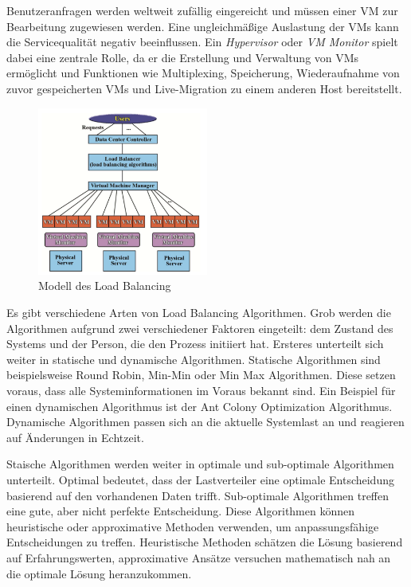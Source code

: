 \documentclass[a4paper,12pt]{article}
\begin{document}
Benutzeranfragen werden weltweit zufällig eingereicht und müssen einer \ac{VM} zur Bearbeitung zugewiesen werden. Eine ungleichmäßige Auslastung der \acp{VM} kann die Servicequalität negativ beeinflussen. Ein \textit{Hypervisor} oder \textit{\ac{VM} Monitor} spielt dabei eine zentrale Rolle, da er die Erstellung und Verwaltung von \acp{VM} ermöglicht und Funktionen wie Multiplexing, Speicherung, Wiederaufnahme von zuvor gespeicherten \acp{VM} und Live-Migration zu einem anderen Host bereitstellt. \cite[S. 2]{LoadBalancing}

\begin{figure}[h]
    \centering
    \includegraphics[width=0.5\textwidth]{images/Load_Balancing.png}
    \caption{Modell des Load Balancing \cite[S. 2]{LoadBalancing}}
    \label{fig:LoadBalancing}
\end{figure}

Es gibt verschiedene Arten von Load Balancing Algorithmen. Grob werden die Algorithmen aufgrund zwei verschiedener Faktoren eingeteilt: dem Zustand des Systems und der Person, die den Prozess initiiert hat. 
Ersteres unterteilt sich weiter in statische und dynamische Algorithmen. Statische Algorithmen sind beispielsweise Round Robin, Min-Min oder Min Max Algorithmen. Diese setzen voraus, dass alle Systeminformationen im Voraus bekannt sind. Ein Beispiel für einen dynamischen Algorithmus ist der Ant Colony Optimization Algorithmus. Dynamische Algorithmen passen sich an die aktuelle Systemlast an und reagieren auf Änderungen in Echtzeit. 

Staische Algorithmen werden weiter in optimale und sub-optimale Algorithmen unterteilt. Optimal bedeutet, dass der Lastverteiler eine optimale Entscheidung basierend auf den vorhandenen Daten trifft. Sub-optimale Algorithmen treffen eine gute, aber nicht perfekte Entscheidung. Diese Algorithmen können heuristische oder approximative Methoden verwenden, um anpassungsfähige Entscheidungen zu treffen. Heuristische Methoden schätzen die Lösung basierend auf Erfahrungswerten, approximative Ansätze versuchen mathematisch nah an die optimale Lösung heranzukommen. 
\end{document}
